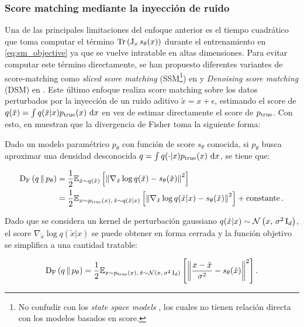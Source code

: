 \subsubsection{Score matching mediante la inyección de ruido}

Una de las principales limitaciones del enfoque anterior es el tiempo cuadrático que toma computar el término $\operatorname{Tr}\left(\operatorname{J}_x s_\theta(x)\right)$ durante el entrenamiento en \eqref{eq:sm_objective} ya que se vuelve intratable en altas dimensiones. Para evitar computar este término directamente, se han propuesto diferentes variantes de score-matching como \textit{sliced score matching} (SSM\footnote{No confudir con los \textit{state space models} \cite{gu2022efficientlymodelinglongsequences}, los cuales no tienen relación directa con los modelos basados en score.}) en \cite{song2019sliced} y \textit{Denoising score matching} (DSM) en \cite{DSM}. Este último enfoque realiza score matching sobre los datos perturbados por la inyección de un ruido aditivo $\tilde{x} = x+\epsilon$, estimando el score de $q(\tilde{x})=\int q(\tilde{x}|x)p_{\operatorname{true}}(x)\,\operatorname{d}\! x$ en vez de estimar directamente el score de $p_{\operatorname{true}}$. Con esto, en \cite{DSM} muestran que la divergencia de Fisher toma la siguiente forma:

\begin{prop}
    \label{prop:fisher_dsm}
    Dado un modelo paramétrico $p_\theta$ con función de score $s_\theta$ conocida, si $p_\theta$ busca aproximar una densidad desconocida $q=\int q(\cdot|x)p_{\operatorname{true}}(x)\,\operatorname{d}\! x$, se tiene que:

    \begin{align*}
        \operatorname{D_F}\left(q\,\|\,p_\theta\right) & = \frac{1}{2}\mathbb{E}_{\tilde{x}\sim q(\tilde{x})}\left[\left\lVert \nabla_{\tilde{x}}\log q(\tilde{x}) - s_\theta(\tilde{x}) \right\rVert^2\right]                               \\
                         & = \frac{1}{2}\mathbb{E}_{x\sim p_{\operatorname{true}}(x),\,\tilde{x}\sim q(\tilde{x}|x)}\left[\left\lVert \nabla_{\tilde{x}}\log q(\tilde{x}|x) - s_\theta(\tilde{x}) \right\rVert^2\right] + \operatorname{constante} .
    \end{align*}
\end{prop}

Dado que se considera un kernel de perturbación gaussiano $q(\tilde{x}|x) \sim \mathcal{N}\left(x,\,\sigma^2 \operatorname{I}_{d}\right)$, el score $\nabla_{\tilde{x}}\log q(\tilde{x}|x)$ se puede obtener en forma cerrada y la función objetivo se simplifica a una cantidad tratable:

\begin{equation}
    \label{eq:fisher_dsm}
    \operatorname{D_F}\left(q\,\|\,p_\theta\right) = \frac{1}{2}\mathbb{E}_{x\sim p_{\operatorname{true}}(x),\,\tilde{x}\sim \mathcal{N}\left(x,\,\sigma^2 \operatorname{I}_{d}\right)}\left[\left\lVert \frac{x-\tilde{x}}{\sigma^2} - s_\theta(\tilde{x}) \right\rVert^2\right] .
\end{equation}

